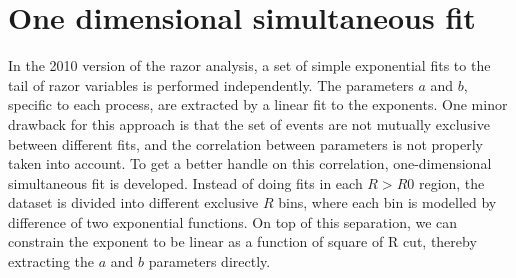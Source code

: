 \documentclass[12pt,a4paper]{article}
\author{Yi Chen}
\begin{document}
\section{One dimensional simultaneous fit}

In the 2010 version of the razor analysis, a set of simple exponential fits to the tail of razor variables is performed independently.
The parameters $a$ and $b$, specific to each process, are extracted by a linear fit to the exponents.
One minor drawback for this approach is that the set of events are not mutually exclusive between different fits, and the correlation between parameters is not properly taken into account.
To get a better handle on this correlation, one-dimensional simultaneous fit is developed.
Instead of doing fits in each $R > R0$ region, the dataset is divided into different exclusive $R$ bins, where each bin is modelled by difference of two exponential functions.
On top of this separation, we can constrain the exponent to be linear as a function of square of R cut, thereby extracting the $a$ and $b$ parameters directly.
\end{document}
